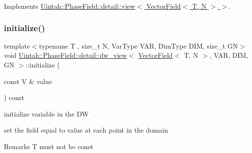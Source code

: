 Implements \hyperlink{classUintah_1_1PhaseField_1_1detail_1_1view_3_01VectorField_3_01T_00_01N_01_4_01_4_a50235465cae83d2080d48dbf4a3c3597}{Uintah\+::\+Phase\+Field\+::detail\+::view$<$ Vector\+Field$<$ T, N $>$ $>$}.

\mbox{\label{classUintah_1_1PhaseField_1_1detail_1_1dw__view_3_01VectorField_3_01T_00_01N_01_4_00_01VAR_00_01DIM_00_01GN_01_4_a4610dc8d6dda1c6b8b66863d854ca7bd}} 
\subsubsection{\texorpdfstring{initialize()}{initialize()}}
{\footnotesize\ttfamily template$<$typename T , size\+\_\+t N, Var\+Type V\+AR, Dim\+Type D\+IM, size\+\_\+t GN$>$ \\
void \hyperlink{classUintah_1_1PhaseField_1_1detail_1_1dw__view}{Uintah\+::\+Phase\+Field\+::detail\+::dw\+\_\+view}$<$ \hyperlink{structUintah_1_1PhaseField_1_1VectorField}{Vector\+Field}$<$ T, N $>$, V\+AR, D\+IM, GN $>$\+::initialize (\begin{DoxyParamCaption}\item[{const V \&}]{value }\end{DoxyParamCaption}) const\hspace{0.3cm}{\ttfamily [inline]}}



initialize variable in the DW 

set the field equal to value at each point in the domain

\begin{DoxyRemark}{Remarks}
T must not be const
\end{DoxyRemark}

